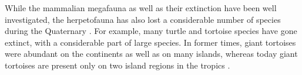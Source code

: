 
While the mammalian megafauna as well as their extinction %
have been well investigated, the herpetofauna has also lost a considerable number of species during the Quaternary \citep{Blain2016}. 
For example, many turtle and tortoise species have gone extinct, with a considerable part of large species.
In former times, giant tortoises were abundant on the continents as well as on many islands, whereas today giant tortoises are present only on two island regions in the tropics
.









